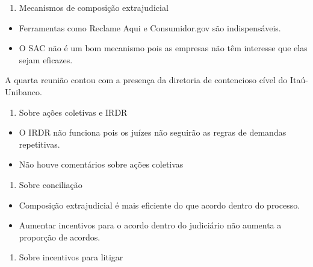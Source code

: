 \documentclass[]{report}
\providecommand{\tightlist}{%
  \setlength{\itemsep}{0pt}\setlength{\parskip}{0pt}}
\begin{document}
\begin{enumerate}
\def\labelenumi{\arabic{enumi}.}
\tightlist
\item
  Mecanismos de composição extrajudicial
\end{enumerate}

\begin{itemize}
\tightlist
\item
  Ferramentas como Reclame Aqui e Consumidor.gov são indispensáveis.
\item
  O SAC não é um bom mecanismo pois as empresas não têm interesse que
  elas sejam eficazes.
\end{itemize}

A quarta reunião contou com a presença da diretoria de contencioso cível
do Itaú-Unibanco.

\begin{enumerate}
\def\labelenumi{\arabic{enumi}.}
\tightlist
\item
  Sobre ações coletivas e IRDR
\end{enumerate}

\begin{itemize}
\tightlist
\item
  O IRDR não funciona pois os juízes não seguirão as regras de demandas
  repetitivas.
\item
  Não houve comentários sobre ações coletivas
\end{itemize}

\begin{enumerate}
\def\labelenumi{\arabic{enumi}.}
\tightlist
\item
  Sobre conciliação
\end{enumerate}

\begin{itemize}
\tightlist
\item
  Composição extrajudicial é mais eficiente do que acordo dentro do
  processo.
\item
  Aumentar incentivos para o acordo dentro do judiciário não aumenta a
  proporção de acordos.
\end{itemize}

\begin{enumerate}
\def\labelenumi{\arabic{enumi}.}
\tightlist
\item
  Sobre incentivos para litigar
\end{enumerate}
\end{document}
